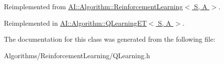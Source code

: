 Reimplemented from \hyperlink{classAI_1_1Algorithm_1_1ReinforcementLearning_a25d7fa245a79e61061436dc0f1db90cb}{A\-I\-::\-Algorithm\-::\-Reinforcement\-Learning$<$ S, A $>$}.



Reimplemented in \hyperlink{classAI_1_1Algorithm_1_1QLearningET_a9a245dcb3ca8f26b37e5a6daa6d4a898}{A\-I\-::\-Algorithm\-::\-Q\-Learning\-E\-T$<$ S, A $>$}.



The documentation for this class was generated from the following file\-:\begin{DoxyCompactItemize}
\item 
Algorithms/\-Reinforcement\-Learning/Q\-Learning.\-h\end{DoxyCompactItemize}
